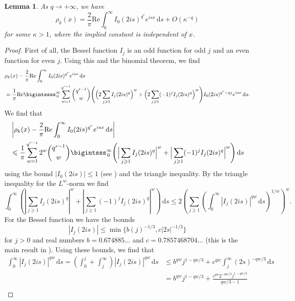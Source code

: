 \documentclass[12pt,reqno]{amsart}
\theoremstyle{definition}
\theoremstyle{plain}
\newtheorem{lemma}[theorem]{Lemma}
\theoremstyle{definition}
\renewcommand{\geq}{\geqslant}
\renewcommand{\leq}{\leqslant}
\renewcommand{\Re}{\mathrm{Re}}
\renewcommand{\d}{\mathrm{d}}
\begin{document}
\begin{lemma}
	\label{Lem:725}
	As $q \rightarrow +\infty$, we have  
	\[
	\rho_{k}(x) = \frac{2}{\pi} \Re \int_{0}^{\infty} I_{0}(2 i s)^{q^r} e^{i s x} \, \d s + O(\kappa^{-q})
	\]
	for some $\kappa>1$, where the implied constant is independent of $x$.
\end{lemma}
\begin{proof}
	First of all, the Bessel function $I_j$ is an odd function for odd $j$ and an even function for even $j$. Using this and the binomial theorem, we find
	\begin{align*}
		&\rho_{k}(x) - \frac{2}{\pi} \Re \int_{0}^{\infty} I_{0}(2 i s)^{q^r} e^{i s x} \, \d s \\&= 
		\frac{1}{\pi} \Re \bigintssss_{\, 0}^{\infty} \sum_{w = 1}^{q^{r-1}} \binom{q^{r-1}}{w} \Bigg(\Big(2\sum_{j \geq 1} I_{j}(2 i s)^q \Big)^w + \Big(2\sum_{j \geq 1} (-1)^j I_{j}(2 i s)^q \Big)^w\Bigg) I_{0}(2 i s)^{q^r - qj} e^{i s x} \, \d s.
	\end{align*}
	We find that
	\begin{align*}
		&\left| \rho_{k}(x) - \frac{2}{\pi} \Re \int_{0}^{\infty} I_{0}(2 i s)^{q^r} e^{i s x} \, \d s \right| \\& \leq  
		\frac{1}{\pi} \sum_{w = 1}^{q^{r-1}} 2^w \binom{q^{r-1}}{w}  \bigintsss_{\, 0}^{\infty} \Bigg( \Big|\sum_{j \geq 1} I_{j}(2 i s)^q \Big| ^w + \Big|\sum_{j \geq 1} (-1)^j I_{j}(2 i s)^q \Big|^w\Bigg)  \, \d s
	\end{align*}
	using the bound $|I_0(2 i s)| \leq 1$ (see \cite[10.14.1]{NIST}) and the triangle inequality. 
	By the triangle inequality for the $L^{w}$-norm we find
	\begin{equation}
		\label{eq:ineqBess}
		\int_{0}^{\infty} \left( \left|\sum_{j \geq 1} I_{j}(2 i s)^q \right| ^w + \left|\sum_{j \geq 1} (-1)^j I_{j}(2 i s)^q \right|^w\right)  \, \d s \leq 2 \left( \sum_{j \geq 1} \left(\int_{0}^\infty |I_{j}(2 i s)|^{qw} \, \d s \right)^{1/w} \right)^w.
	\end{equation} 
	For the Bessel function we have the bounds
	\[
	|I_{j}(2 i s)| \leq \min \{ b (j)^{-1/3}, c |2s|^{-1/3}\}
	\]
	for $j > 0$ and real numbers $b = 0.674885\dots$ and $c = 0.7857468704 \dots$ (this is the main result in \cite{Landau}). Using these bounds, we find that
	\begin{align*}
		\int_0^\infty |I_{j}(2 i s)|^{qw} \, \d s= \left( \int_0^{j} + \int_{j}^{\infty} \right) |I_{j}(2 i s)|^{qw} \, \d s &\leq b^{qw} j^{1 -qw/3} + c^{qw} \int_{j}^\infty  (2s)^{-qw/3} \, \d s \\ &= b^{qw} j^{1 -qw/3} + \frac{c^{qw} 2^{-qw/3} j^{1- qw/3}}{qw/3 - 1}\\

\end{align*}
\end{proof}
\end{document}
